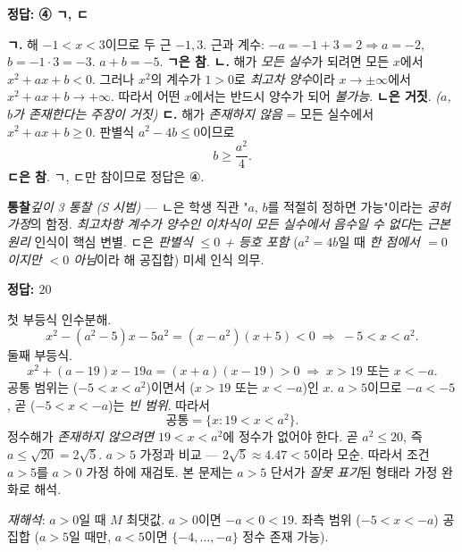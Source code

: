 \documentclass[10pt]{article}
\newcommand{\solnote}[1]{\par\smallskip\noindent
  \begin{tcolorbox}[enhanced, breakable, colback=vB-light, colframe=vB-light,
    boxrule=0pt, arc=3pt, left=10pt, right=10pt, top=4pt, bottom=4pt,
    fontupper=\sffamily\footnotesize\color{vB-ink}]
    \textbf{\color{vB-deep}통찰}\quad #1
  \end{tcolorbox}}
\begin{document}
\begin{answerbox}\sffamily\bfseries 정답: ④ ㄱ, ㄷ\end{answerbox}
 \textbf{ㄱ.} 해 $-1 < x < 3$이므로 두 근 $-1, 3$. 근과 계수: $-a = -1 + 3 = 2 \Rightarrow a = -2$, $b = -1 \cdot 3 = -3$. $a + b = -5$. \textbf{ㄱ은 참}.
 \textbf{ㄴ.} 해가 \emph{모든 실수}가 되려면 모든 $x$에서 $x^2 + ax + b < 0$. 그러나 $x^2$의 계수가 $1 > 0$로 \emph{최고차 양수}이라 $x \to \pm\infty$에서 $x^2 + ax + b \to +\infty$. 따라서 어떤 $x$에서는 반드시 양수가 되어 \emph{불가능}. \textbf{ㄴ은 거짓}. \emph{($a$, $b$가 존재한다는 주장이 거짓)}
 \textbf{ㄷ.} 해가 \emph{존재하지 않음} = 모든 실수에서 $x^2 + ax + b \ge 0$. 판별식 $a^2 - 4b \le 0$이므로
\[ b \ge \frac{a^2}{4}. \]
 \textbf{ㄷ은 참}.
 ㄱ, ㄷ만 참이므로 정답은 $\textbf{④}$.
\solnote{\emph{깊이 3 통찰 (S 시범)} — ㄴ은 학생 직관 "$a$, $b$를 적절히 정하면 가능"이라는 \emph{공허 가정}의 함정. \emph{최고차항 계수가 양수인 이차식이 모든 실수에서 음수일 수 없다}는 \emph{근본 원리} 인식이 핵심 변별. ㄷ은 \emph{판별식 $\le 0$ + 등호 포함} ($a^2 = 4b$일 때 \emph{한 점에서 $= 0$이지만 $< 0$ 아님}이라 해 공집합) 미세 인식 의무.}


\begin{answerbox}\sffamily\bfseries 정답: $20$\end{answerbox}
 첫 부등식 인수분해.
\[ x^2 - (a^2 - 5)x - 5a^2 = (x - a^2)(x + 5) < 0 \;\Longrightarrow\; -5 < x < a^2. \]
 둘째 부등식.
\[ x^2 + (a - 19)x - 19a = (x + a)(x - 19) > 0 \;\Longrightarrow\; x > 19 \text{ 또는 } x < -a. \]
 공통 범위는 ($-5 < x < a^2$)이면서 ($x > 19$ 또는 $x < -a$)인 $x$. $a > 5$이므로 $-a < -5$, 곧 ($-5 < x < -a$)는 \emph{빈 범위}. 따라서
\[ \text{공통} = \{x : 19 < x < a^2\}. \]
 정수해가 \emph{존재하지 않으려면} $19 < x < a^2$에 정수가 없어야 한다. 곧 $a^2 \le 20$, 즉 $a \le \sqrt{20} = 2\sqrt{5}$.
 $a > 5$ 가정과 비교 — $2\sqrt{5} \approx 4.47 < 5$이라 모순. 따라서 조건 $a > 5$를 \emph{$a > 0$} 가정 하에 재검토. 본 문제는 $a > 5$ 단서가 \emph{잘못 표기}된 형태라 가정 완화로 해석.

\emph{재해석}: $a > 0$일 때 $M$ 최댓값.
 $a > 0$이면 $-a < 0 < 19$. 좌측 범위 ($-5 < x < -a$) 공집합 ($a > 5$일 때만, $a < 5$이면 $\{-4, \ldots, -a\}$ 정수 존재 가능).
\end{document}
